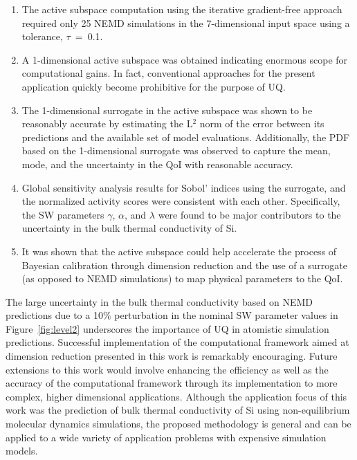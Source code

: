 \begin{enumerate}
\item The active subspace computation using the iterative gradient-free approach
required only 25 NEMD simulations in the 7-dimensional input space using a tolerance, 
$\tau$~=~0.1.

\item A 1-dimensional active subspace was obtained indicating enormous scope for
computational gains. In fact, conventional
approaches for the present application quickly become prohibitive for
the purpose of UQ. 

\item The 1-dimensional surrogate in the active subspace was shown to be reasonably accurate
by estimating the L$^2$ norm of the error between its predictions and the available set of
model evaluations. Additionally, the PDF based on the 1-dimensional surrogate was 
observed to capture the mean, mode, and the uncertainty in the QoI with reasonable accuracy.

\item Global sensitivity analysis results for Sobol' indices using the surrogate, and the
normalized activity scores were consistent with each other. Specifically, the SW parameters
$\gamma$, $\alpha$, and $\lambda$ were found to be major contributors to the
uncertainty in the bulk thermal conductivity of Si.

\item It was shown that the active subspace could help accelerate the process
of Bayesian calibration through dimension reduction and the use of a surrogate 
(as opposed to NEMD simulations) to map physical parameters to the QoI.    

\end{enumerate}
%
The large uncertainty in the bulk thermal conductivity based on NEMD predictions due to
a 10$\%$ perturbation in the nominal SW parameter values in Figure~\ref{fig:level2} underscores
the importance of UQ in atomistic simulation predictions. Successful implementation of the
computational framework aimed at dimension reduction presented in this work is remarkably
encouraging. Future extensions to this work would involve enhancing the efficiency as well
as the accuracy of the computational framework through its implementation to more complex,
higher dimensional applications. Although the application focus of this work was the prediction of
bulk thermal conductivity of Si using non-equilibrium molecular dynamics simulations, the proposed
methodology is general and can be applied to a wide variety of application problems with expensive 
simulation models. 
